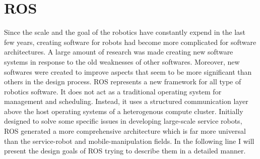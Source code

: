 \section{ROS}
\label{sec:ros}
Since the scale and the goal of the robotics have constantly expend in the last few years, creating software
for robots had become more complicated for software architectures. A large amount of research was made creating
new software systems in response to the old weaknesses of other softwares. Moreover, new softwares were created
to improve aspects that seem to be more significant than others in the design process. ROS represents a new framework
for all type of robotics software. It does not act as a traditional operating system for management and scheduling.
Instead, it uses a structured communication layer above the host operating systems of a heterogenous compute cluster.
Initially designed to solve some specific issues in developing large-scale service robots, ROS generated a more comprehensive
architecture which is far more  universal than the service-robot and mobile-manipulation fields. 
In the following line I will present the design goals of ROS trying to describe them in a detailed manner. 
